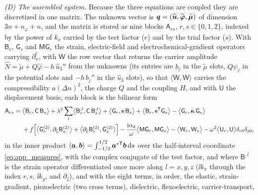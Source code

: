 \emph{(D) The assembled system.}  Because the three equations are coupled they are
discretized in one matrix.  The unknown vector is
$\boldsymbol{q}=(\widehat{\boldsymbol{u}},\widehat{\boldsymbol\varphi},
\widetilde{\boldsymbol\mu})$ of dimension $3n+n_\varphi+n$, and the matrix is
stored as nine blocks $\mathsf A_{rs}$, $r,s\in\{0,1,2\}$, indexed by the power of
$k_x$ carried by the test factor ($r$) and by the trial factor ($s$).  With
$\mathsf B_r$, $\mathsf G_r$ and $\mathsf M\mathsf G_r$ the strain, electric-field
and electrochemical-gradient operators carrying $\partial_x^{r}$, with
$\mathsf W$ the row vector that returns the carrier amplitude
$\widehat N=\widetilde\mu+Q\widehat\varphi-h\,\widehat u_3''$ from the unknowns
(its entries are $b_j$ in the $\widetilde\mu$ slots, $Q\psi_j$ in the potential slots
and $-h\,b_j''$ in the $\widehat u_3$ slots), so that $\langle\mathsf W,\mathsf W\rangle$
carries the compressibility $a(\Delta n)^{2}$, the charge $Q$ and the coupling $H$, and with $\mathsf U$ the displacement basis, each block is the bilinear form
\begin{equation}
\label{eq:block}
\begin{aligned}
\mathsf A_{rs}={}&\bigl\langle\mathsf B_r,\mathsf C\,\mathsf B_s\bigr\rangle
+\lambda^{2}\sum_{l}\bigl\langle\mathsf B^{,l}_r,
\mathsf C\,\mathsf B^{,l}_s\bigr\rangle
+\bigl\langle\mathsf G_r,\mathsf e\,\mathsf B_s\bigr\rangle
+\bigl\langle\mathsf B_r,\mathsf e^{\mathsf T}\mathsf G_s\bigr\rangle
-\bigl\langle\mathsf G_r,\boldsymbol\kappa\,\mathsf G_s\bigr\rangle\\
&+f\Bigl[\bigl\langle\mathsf G_r^{(2)},\partial_\zeta\mathsf B_s^{(2)}\bigr\rangle
+\bigl\langle\partial_\zeta\mathsf B_r^{(2)},\mathsf G_s^{(2)}\bigr\rangle\Bigr]
-\frac{\mathrm{i}\alpha_{\mathrm d}}{\omega}\bigl\langle\mathsf M\mathsf G_r,
\mathsf M\mathsf G_s\bigr\rangle
-\bigl\langle\mathsf W_r,\mathsf W_s\bigr\rangle
-\omega^{2}\bigl\langle\mathsf U_r,\mathsf U\bigr\rangle\delta_{r0}\delta_{s0},
\end{aligned}
\end{equation}
in the inner product $\langle\boldsymbol{a},\boldsymbol{b}\rangle=\int_{-1/2}^{1/2}
\boldsymbol{a}^{*\mathsf T}\boldsymbol{b}\,\mathrm{d} s$ over the half-interval coordinate
\eqref{eq:app_measures}, with the complex conjugate of the test factor, and where $\mathsf B^{,l}$ is the strain operator differentiated once more along $l=x,y,z$ ($\ii k_x$ through the index $r,s$, $\ii k_y$, and $\partial_\zeta$), and with the eight terms, in order, the elastic, strain-gradient,
piezoelectric (two cross terms), dielectric, flexoelectric, carrier-transport,
